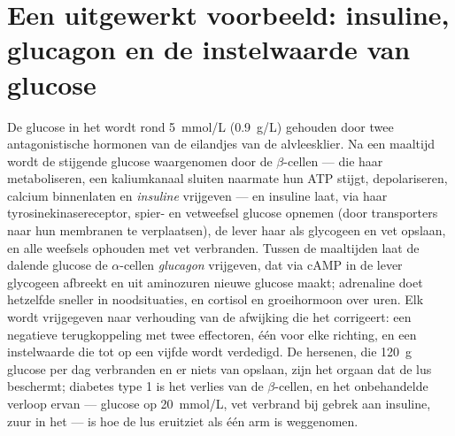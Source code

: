 \section{Een uitgewerkt voorbeeld: insuline, glucagon en de instelwaarde van glucose}

\begin{proposition}\label{prop:b2:cell-signalling:glucose}
De glucose in het  wordt rond \qty{5}{mmol/L} (\qty{0.9}{g/L}) gehouden
door twee antagonistische hormonen van de eilandjes van de alvleesklier. Na
een maaltijd wordt de stijgende glucose waargenomen door de $\beta$-cellen ---
die haar metaboliseren, een kaliumkanaal sluiten naarmate hun ATP stijgt,
depolariseren, calcium binnenlaten en \emph{insuline} vrijgeven --- en
insuline laat, via haar tyrosinekinasereceptor, spier- en vetweefsel glucose
opnemen (door transporters naar hun membranen te verplaatsen), de lever haar
als glycogeen en vet opslaan, en alle weefsels ophouden met vet verbranden.
Tussen de maaltijden laat de dalende glucose de $\alpha$-cellen
\emph{glucagon} vrijgeven, dat via cAMP in de lever glycogeen afbreekt en uit
aminozuren nieuwe glucose maakt; adrenaline doet hetzelfde sneller in
noodsituaties, en cortisol en groeihormoon over uren. Elk  wordt
vrijgegeven naar verhouding van de afwijking die het corrigeert: een negatieve
terugkoppeling met twee effectoren, één voor elke richting, en een
instelwaarde die tot op een vijfde wordt verdedigd. De hersenen, die
\qty{120}{g} glucose per dag verbranden en er niets van opslaan, zijn het
orgaan dat de lus beschermt; diabetes type 1 is het verlies van de
$\beta$-cellen, en het onbehandelde verloop ervan --- glucose op
\qty{20}{mmol/L}, vet verbrand bij gebrek aan insuline, zuur in het 
--- is hoe de lus eruitziet als één arm is weggenomen.
\end{proposition}

